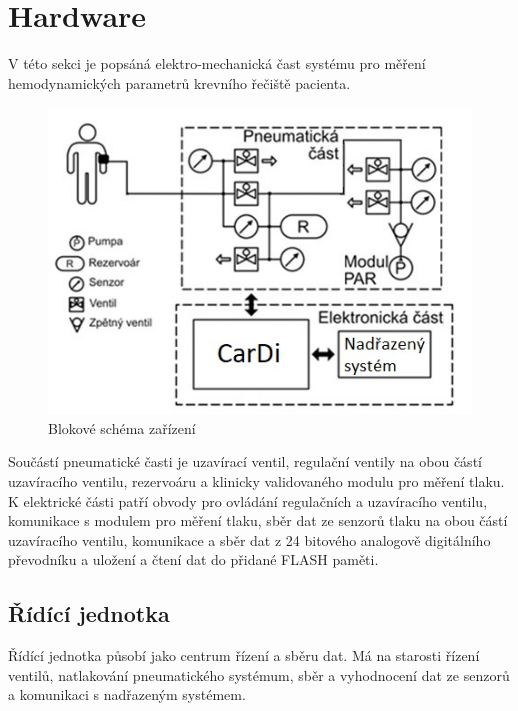 \chapter{Hardware}
V této sekci je popsáná elektro-mechanická čast systému pro měření hemodynamických parametrů krevního řečiště pacienta.

\begin{figure}[H]
    \label{fig:block_cardi}
    \includegraphics[width=1\textwidth]{pictures/blokove_schema_cele_zarizeni.jpg}
    \caption{Blokové schéma zařízení}
\end{figure}
Součástí pneumatické časti je uzavírací ventil, regulační ventily na obou částí uzavíracího ventilu, rezervoáru a klinicky validovaného modulu pro měření tlaku.
K elektrické části patří obvody pro ovládání regulačních a uzavíracího ventilu, komunikace s modulem pro měření tlaku, sběr dat ze senzorů tlaku na obou částí uzavíracího ventilu, komunikace a sběr dat z 24 bitového analogově digitálního převodníku a
uložení a čtení dat do přidané FLASH paměti.
\section{Řídící jednotka}

Řídící jednotka působí jako centrum řízení a sběru dat. Má na starosti řízení ventilů, natlakování pneumatického systémum, sběr a vyhodnocení
dat ze senzorů a komunikaci s nadřazeným systémem. \par

